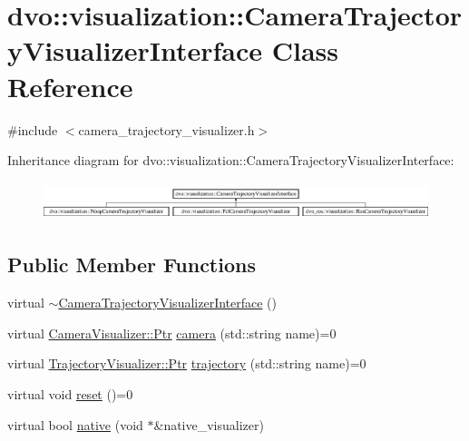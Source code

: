 \hypertarget{classdvo_1_1visualization_1_1_camera_trajectory_visualizer_interface}{}\section{dvo\+:\+:visualization\+:\+:Camera\+Trajectory\+Visualizer\+Interface Class Reference}
\label{classdvo_1_1visualization_1_1_camera_trajectory_visualizer_interface}


{\ttfamily \#include $<$camera\+\_\+trajectory\+\_\+visualizer.\+h$>$}

Inheritance diagram for dvo\+:\+:visualization\+:\+:Camera\+Trajectory\+Visualizer\+Interface\+:\begin{figure}[H]
\begin{center}
\leavevmode
\includegraphics[height=1.131313cm]{classdvo_1_1visualization_1_1_camera_trajectory_visualizer_interface}
\end{center}
\end{figure}
\subsection*{Public Member Functions}
\begin{DoxyCompactItemize}
\item 
virtual \mbox{\hyperlink{classdvo_1_1visualization_1_1_camera_trajectory_visualizer_interface_ac0b5599dd9994a0283eaaa227d609bfd}{$\sim$\+Camera\+Trajectory\+Visualizer\+Interface}} ()
\item 
virtual \mbox{\hyperlink{classdvo_1_1visualization_1_1_camera_visualizer_a473ebecc62e1d4edba21027d858789a2}{Camera\+Visualizer\+::\+Ptr}} \mbox{\hyperlink{classdvo_1_1visualization_1_1_camera_trajectory_visualizer_interface_a4d43cd43f26bd880eb07e8ee37a7154a}{camera}} (std\+::string name)=0
\item 
virtual \mbox{\hyperlink{classdvo_1_1visualization_1_1_trajectory_visualizer_aac33ef5979fe64ee33409f1afa977fd3}{Trajectory\+Visualizer\+::\+Ptr}} \mbox{\hyperlink{classdvo_1_1visualization_1_1_camera_trajectory_visualizer_interface_ac658e841335e51c50325267de10e64b3}{trajectory}} (std\+::string name)=0
\item 
virtual void \mbox{\hyperlink{classdvo_1_1visualization_1_1_camera_trajectory_visualizer_interface_abcc7ddffc30b41eb9112c386f3e41aa7}{reset}} ()=0
\item 
virtual bool \mbox{\hyperlink{classdvo_1_1visualization_1_1_camera_trajectory_visualizer_interface_aa034546bfbdfa55855c56ab21df41b8e}{native}} (void $\ast$\&native\+\_\+visualizer)
\end{DoxyCompactItemize}


